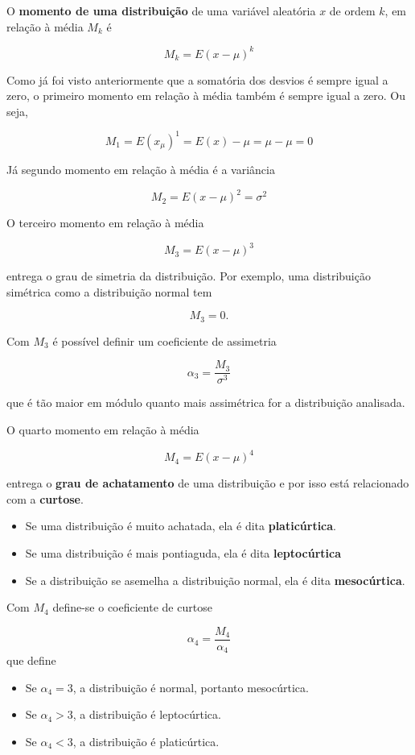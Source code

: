 \documentclass[
]{book}
\providecommand{\tightlist}{%
  \setlength{\itemsep}{0pt}\setlength{\parskip}{0pt}}
\begin{document}
O \textbf{momento de uma distribuição} de uma variável aleatória \(x\) de ordem \(k\), em relação à média \(M_k\) é

\[
  M_k = E(x - \mu)^k
\]

Como já foi visto anteriormente que a somatória dos desvios é sempre igual a zero, o primeiro momento em relação à média também é sempre igual a zero. Ou seja,

\[
  M_1 = E(x _ \mu)^1 = E(x) - \mu = \mu - \mu = 0
\]

Já segundo momento em relação à média é a variância

\[
  M_2 = E(x - \mu)^2 = \sigma^2
\]

O terceiro momento em relação à média

\[
  M_3 = E(x - \mu)^3 
\]

entrega o grau de simetria da distribuição. Por exemplo, uma distribuição simétrica como a distribuição normal tem

\[
M_3 = 0.
\]

Com \(M_3\) é possível definir um coeficiente de assimetria

\[
  \alpha_3 = \dfrac{M_3}{\sigma^3}
\]

que é tão maior em módulo quanto mais assimétrica for a distribuição analisada.

O quarto momento em relação à média

\[
  M_4 = E(x - \mu)^4 
\]

entrega o \textbf{grau de achatamento} de uma distribuição e por isso está relacionado com a \textbf{curtose}.

\begin{itemize}
\tightlist
\item
  Se uma distribuição é muito achatada, ela é dita \textbf{platicúrtica}.
\item
  Se uma distribuição é mais pontiaguda, ela é dita \textbf{leptocúrtica}
\item
  Se a distribuição se asemelha a distribuição normal, ela é dita \textbf{mesocúrtica}.
\end{itemize}

Com \(M_4\) define-se o coeficiente de curtose

\[
  \alpha_4 = \dfrac{M_4}{\alpha_4}
\]
que define

\begin{itemize}
\tightlist
\item
  Se \(\alpha_4 = 3\), a distribuição é normal, portanto mesocúrtica.
\item
  Se \(\alpha_4 > 3\), a distribuição é leptocúrtica.
\item
  Se \(\alpha_4 < 3\), a distribuição é platicúrtica.
\end{itemize}
\end{document}
